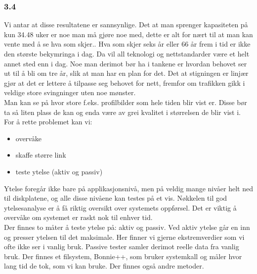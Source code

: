 \documentclass[a4paper, norsk, 12pt]{article}
\begin{document}
\subsubsection*{3.4}
Vi antar at disse resultatene er sannsynlige. Det at man sprenger kapasiteten på kun 34.48 uker er noe man må gjøre noe med, dette er alt for nært til at man kan vente med å se hva som skjer.. Hva som skjer seks år eller 66 år frem i tid er ikke den største bekymringa i dag. Da vil all teknologi og nettstandarder være et helt annet sted enn i dag. Noe man derimot bør ha i tankene er hvordan behovet ser ut til å bli om tre år, slik at man har en plan for det. Det at stigningen er linjær gjør at det er lettere å tilpasse seg behovet for nett, fremfor om trafikken gikk i veldige store svingninger uten noe mønster.\\

Man kan se på hvor store f.eks. profilbilder som hele tiden blir vist er. Disse bør ta så liten plass de kan og enda være av grei kvalitet i størrelsen de blir vist i.\\

For å rette problemet kan vi:
\begin{itemize}
\item overvåke
\item skaffe større link
\item teste ytelse (aktiv og passiv)
\end{itemize}

Ytelse foregår ikke bare på applikasjonsnivå, men på veldig mange nivåer helt ned til diskplatene, og alle disse nivåene kan testes på et vis. Nøkkelen til god ytelsesanalyse er å få riktig oversikt over systemets oppførsel. Det er viktig å overvåke om systemet er raskt nok til enhver tid.\\

Der finnes to måter å teste ytelse på: aktiv og passiv. Ved aktiv ytelse går en inn og presser ytelsen til det maksimale. Her finner vi gjerne ekstremverdier som vi ofte ikke ser i vanlig bruk. Passive tester samler derimot reelle data fra vanlig bruk. Der finnes et filsystem, Bonnie++, som bruker systemkall og måler hvor lang tid de tok, som vi kan bruke. Der finnes også andre metoder.


%

\end{document}
